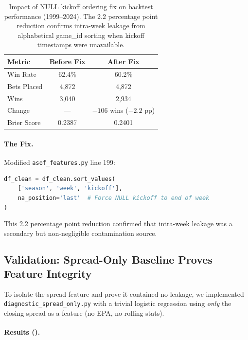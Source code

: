 \begin{table}[!ht]
\centering
\caption[NULL kickoff leakage impact]{Impact of NULL kickoff ordering fix on backtest performance (1999--2024). The 2.2 percentage point reduction confirms intra-week leakage from alphabetical game\_id sorting when kickoff timestamps were unavailable.}
\label{tab:null-kickoff-impact}
\begin{tabular}{lcc}
\toprule
\textbf{Metric}  & \textbf{Before Fix}  & \textbf{After Fix} \\
\midrule
Win Rate & 62.4\% & 60.2\% \\
Bets Placed & 4,872 & 4,872 \\
Wins & 3,040 & 2,934 \\
Change & --- & $-106$ wins ($-2.2$ pp) \\
Brier Score & 0.2387 & 0.2401 \\
\bottomrule
\end{tabular}
\end{table}

\paragraph{The Fix.}
Modified \texttt{asof\_features.py} line 199:
\begin{lstlisting}[language=Python,basicstyle=\ttfamily\scriptsize]
df_clean = df_clean.sort_values(
    ['season', 'week', 'kickoff'],
    na_position='last'  # Force NULL kickoff to end of week
)
\end{lstlisting}

This 2.2 percentage point reduction confirmed that intra-week leakage was a secondary but non-negligible contamination source.

\subsection{Validation: Spread-Only Baseline Proves Feature Integrity}

To isolate the spread feature and prove it contained no leakage, we implemented \texttt{diagnostic\_spread\_only.py} with a trivial logistic regression using \emph{only} the closing spread as a feature (no EPA, no rolling stats).

\paragraph{Results ().}

